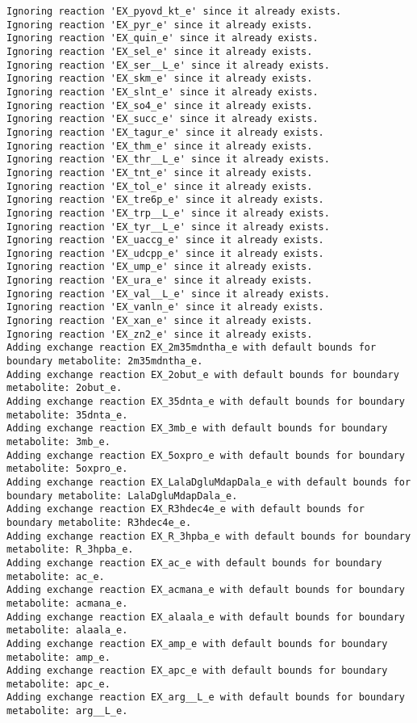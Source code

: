 \documentclass[
  letterpaper,
  DIV=11,
  numbers=noendperiod]{scrartcl}
\begin{document}
\begin{verbatim}
Ignoring reaction 'EX_pyovd_kt_e' since it already exists.
Ignoring reaction 'EX_pyr_e' since it already exists.
Ignoring reaction 'EX_quin_e' since it already exists.
Ignoring reaction 'EX_sel_e' since it already exists.
Ignoring reaction 'EX_ser__L_e' since it already exists.
Ignoring reaction 'EX_skm_e' since it already exists.
Ignoring reaction 'EX_slnt_e' since it already exists.
Ignoring reaction 'EX_so4_e' since it already exists.
Ignoring reaction 'EX_succ_e' since it already exists.
Ignoring reaction 'EX_tagur_e' since it already exists.
Ignoring reaction 'EX_thm_e' since it already exists.
Ignoring reaction 'EX_thr__L_e' since it already exists.
Ignoring reaction 'EX_tnt_e' since it already exists.
Ignoring reaction 'EX_tol_e' since it already exists.
Ignoring reaction 'EX_tre6p_e' since it already exists.
Ignoring reaction 'EX_trp__L_e' since it already exists.
Ignoring reaction 'EX_tyr__L_e' since it already exists.
Ignoring reaction 'EX_uaccg_e' since it already exists.
Ignoring reaction 'EX_udcpp_e' since it already exists.
Ignoring reaction 'EX_ump_e' since it already exists.
Ignoring reaction 'EX_ura_e' since it already exists.
Ignoring reaction 'EX_val__L_e' since it already exists.
Ignoring reaction 'EX_vanln_e' since it already exists.
Ignoring reaction 'EX_xan_e' since it already exists.
Ignoring reaction 'EX_zn2_e' since it already exists.
Adding exchange reaction EX_2m35mdntha_e with default bounds for boundary metabolite: 2m35mdntha_e.
Adding exchange reaction EX_2obut_e with default bounds for boundary metabolite: 2obut_e.
Adding exchange reaction EX_35dnta_e with default bounds for boundary metabolite: 35dnta_e.
Adding exchange reaction EX_3mb_e with default bounds for boundary metabolite: 3mb_e.
Adding exchange reaction EX_5oxpro_e with default bounds for boundary metabolite: 5oxpro_e.
Adding exchange reaction EX_LalaDgluMdapDala_e with default bounds for boundary metabolite: LalaDgluMdapDala_e.
Adding exchange reaction EX_R3hdec4e_e with default bounds for boundary metabolite: R3hdec4e_e.
Adding exchange reaction EX_R_3hpba_e with default bounds for boundary metabolite: R_3hpba_e.
Adding exchange reaction EX_ac_e with default bounds for boundary metabolite: ac_e.
Adding exchange reaction EX_acmana_e with default bounds for boundary metabolite: acmana_e.
Adding exchange reaction EX_alaala_e with default bounds for boundary metabolite: alaala_e.
Adding exchange reaction EX_amp_e with default bounds for boundary metabolite: amp_e.
Adding exchange reaction EX_apc_e with default bounds for boundary metabolite: apc_e.
Adding exchange reaction EX_arg__L_e with default bounds for boundary metabolite: arg__L_e.

\end{verbatim}
\end{document}
